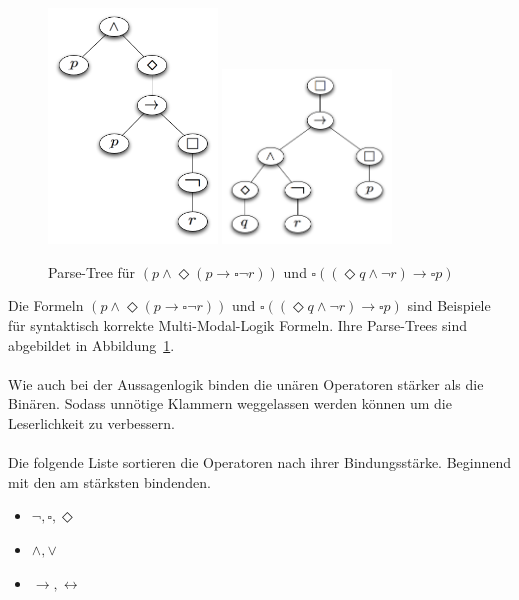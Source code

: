 \begin{figure}[ht]
	\begin{center}
  	\includegraphics[width=0.4\textwidth]{./Images/mmFormel01.png}
		\includegraphics[width=0.4\textwidth]{./Images/mmFormel02.png}
  	\caption{Parse-Tree für $(p \wedge \Diamond(p \rightarrow \square \neg r))$ und 
		$\square((\Diamond q \wedge \neg r) \rightarrow \square p )$}
		\label{fig:mmFormel01}
	\end{center}
\end{figure}


Die Formeln $(p \wedge \Diamond(p \rightarrow \square \neg r))$ und 
$\square((\Diamond q \wedge \neg r) \rightarrow \square p )$ sind Beispiele für syntaktisch korrekte Multi-Modal-Logik Formeln. Ihre Parse-Trees sind abgebildet in Abbildung~\ref{fig:mmFormel01}.\\
\\
Wie auch bei der Aussagenlogik binden die unären Operatoren stärker als die Binären.
Sodass unnötige Klammern weggelassen werden können um die Leserlichkeit zu verbessern.\\
\\
Die folgende Liste sortieren die Operatoren nach ihrer Bindungsstärke. Beginnend mit den am stärksten bindenden.\\
\begin{itemize}
	\item $\neg, \square, \Diamond$
	\item $\wedge, \vee$
	\item $\rightarrow, \leftrightarrow$
\end{itemize}

